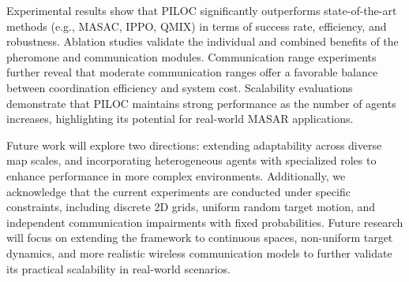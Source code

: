 \documentclass[lettersize,journal]{IEEEtran}
\begin{document}
Experimental results show that PILOC significantly outperforms state-of-the-art methods (e.g., MASAC, IPPO, QMIX) in terms of success rate, efficiency, and robustness. Ablation studies validate the individual and combined benefits of the pheromone and communication modules. Communication range experiments further reveal that moderate communication ranges offer a favorable balance between coordination efficiency and system cost. Scalability evaluations demonstrate that PILOC maintains strong performance as the number of agents increases, highlighting its potential for real-world MASAR applications.

Future work will explore two directions: extending adaptability across diverse map scales, and incorporating heterogeneous agents with specialized roles to enhance performance in more complex environments. Additionally, we acknowledge that the current experiments are conducted under specific constraints, including discrete 2D grids, uniform random target motion, and independent communication impairments with fixed probabilities. Future research will focus on extending the framework to continuous spaces, non-uniform target dynamics, and more realistic wireless communication models to further validate its practical scalability in real-world scenarios.


\vfill
\end{document}
